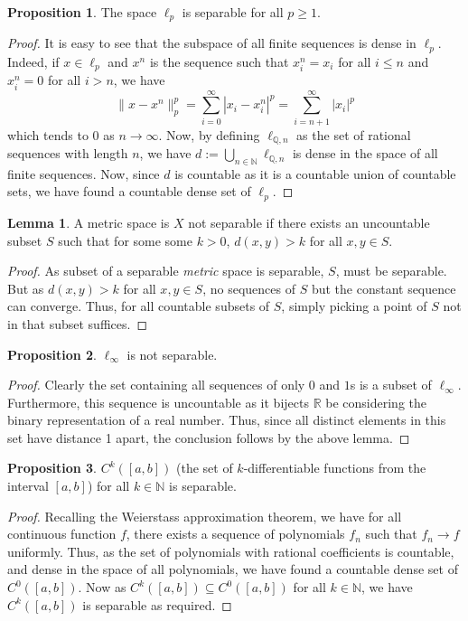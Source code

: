 \documentclass[]{article}
\theoremstyle{definition}
\theoremstyle{definition}
\newtheorem{lemma}{Lemma}[section]
\newtheorem{proposition}{Proposition}[section]
\begin{document}
\begin{proposition}
  The space \(\ell_p\) is separable for all \(p \ge 1\).
\end{proposition}
\begin{proof}
  It is easy to see that the subspace of all finite sequences is dense in 
  \(\ell_p\). Indeed, if \(x \in \ell_p\) and \(x^n\) is the sequence such that 
  \(x^n_i = x_i\) for all \(i \le n\) and \(x^n_i = 0\) for all \(i > n\), 
  we have 
  \[\|x - x^n\|_p^p = \sum_{i = 0}^\infty |x_i - x_i^n|^p = 
    \sum_{i = n + 1}^\infty |x_i|^p\]
  which tends to \(0\) as \(n \to \infty\). Now, by defining 
  \(\ell_{\mathbb{Q}, n}\) as the set of rational sequences with length \(n\),
  we have \(d := \bigcup_{n \in \mathbb{N}} \ell_{\mathbb{Q}, n}\) is dense in the 
  space of all finite sequences. Now, since \(d\) is countable as it is a countable 
  union of countable sets, we have found a countable dense set of \(\ell_p\).
\end{proof}

\begin{lemma}
  A metric space is \(X\) not separable if there exists an uncountable subset \(S\) 
  such that for some some \(k > 0\), \(d(x, y) > k\) for all \(x, y \in S\).
\end{lemma}
\begin{proof}
  As subset of a separable \textit{metric} space is separable, \(S\), must be 
  separable. But as \(d(x, y) > k\) for all \(x, y \in S\), no sequences of 
  \(S\) but the constant sequence can converge. Thus, for all countable subsets 
  of \(S\), simply picking a point of \(S\) not in that subset suffices.
\end{proof}

\begin{proposition}
  \(\ell_\infty\) is not separable.
\end{proposition}
\begin{proof}
  Clearly the set containing all sequences of only \(0\) and \(1\)s is 
  a subset of \(\ell_\infty\). Furthermore, this sequence is uncountable as 
  it bijects \(\mathbb{R}\) be considering the binary representation of a real 
  number. Thus, since all distinct elements in this set have distance 1 apart, 
  the conclusion follows by the above lemma.
\end{proof}

\begin{proposition}
  \(C^k([a, b])\) (the set of \(k\)-differentiable functions from the interval 
  \([a, b]\)) for all \(k \in \mathbb{N}\) is separable.
\end{proposition}
\begin{proof}
  Recalling the Weierstass approximation theorem, we have for all continuous 
  function \(f\), there exists a sequence of polynomials \(f_n\) such that 
  \(f_n \to f\) uniformly. Thus, as the set of polynomials with rational 
  coefficients is countable, and dense in the space of all polynomials, we 
  have found a countable dense set of \(C^0([a, b])\). Now as 
  \(C^k([a, b]) \subseteq C^0([a, b])\) for all \(k \in \mathbb{N}\), we have 
  \(C^k([a, b])\) is separable as required. 
\end{proof}
\end{document}
